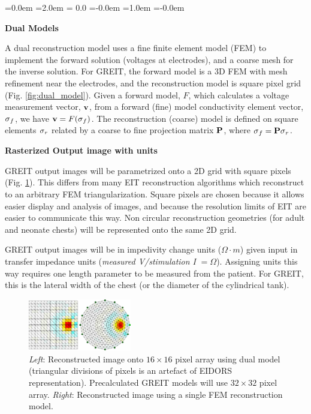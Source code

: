 \documentclass[letterpaper,twocolumn,10pt]{article}
\newcommand{\vB}{\mbox{$\bf v$}}
\newcommand{\PB}{\mbox{$\bf P$}}
\newcommand{\sG}{\mbox{$\bf \sigma$}}
\begin{document}
\begin{list}{\bf {}.}
  {\leftmargin=0.0em \itemindent=2.0em
    \topsep= 0.0\baselineskip
    \itemsep=-0.0em
    \listparindent=1.0em \parsep=-0.0em
    }

\item {\bf Dual Models}

A dual reconstruction model uses a fine finite element
model (FEM) to implement the forward solution (voltages
at electrodes), and a coarse mesh for the inverse
solution. For GREIT, the forward model is a 3D FEM with
mesh refinement near the electrodes, and the reconstruction
model is square pixel grid (Fig. \ref{fig:dual_model}).
Given a forward model, $F$,
which calculates a voltage measurement vector, $\vB$, from
a forward (fine) model conductivity element vector, $\sG_f$, we
have $\vB = F( \sG_f )$. The reconstruction (coarse)
model is defined on square elements $\sG_r$ related by
a coarse to fine projection matrix $\PB$, where $\sG_f = \PB \sG_r$.

\item {\bf Rasterized Output image with units}

GREIT output images will be parametrized onto
a 2D grid with square pixels (Fig. \ref{fig:square_pixels}).
This differs from many EIT reconstruction algorithms
which reconstruct to an arbitrary FEM triangularization.
Square pixels are chosen because it allows easier
display and analysis of images, and because the 
resolution limits of EIT are easier to communicate this way.
Non circular reconstruction geometries (for adult and
neonate chests) will be represented onto the same 2D grid.

GREIT output images will be in impedivity change units
($\Omega\cdot m$) given input in transfer impedance units
({\em measured V/stimulation I} $=\Omega$). Assigning units
this way requires one length parameter to be measured
from the patient. For GREIT, this is the lateral width of
the chest (or the diameter of the cylindrical tank).

\begin{figure}[tbh]
\begin{center}
 \includegraphics[width= 0.4\textwidth, bb=0 0 749 378]{figs/square_mesh06a.png}
\caption{ \label{fig:square_pixels}
\small
{\em Left}: Reconstructed image onto $16\times 16$ pixel array using
dual model (triangular divisions of pixels is an artefact of EIDORS
representation). Precalculated GREIT models
will use $32\times 32$ pixel array.
{\em Right}: Reconstructed image using a single FEM reconstruction model.
}
\end{center}
\end{figure}


\end{list}
\end{document}
